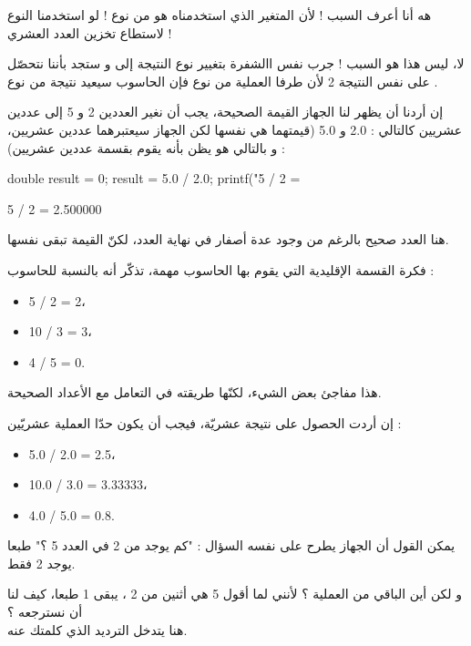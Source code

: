 \begin{question}
  هه أنا أعرف السبب ! لأن المتغير
  الذي استخدمناه هو من نوع
   !
  لو استخدمنا النوع
  لاستطاع تخزين العدد العشري !
\end{question}

لا، ليس هذا هو السبب ! جرب  نفس االشفرة بتغيير نوع النتيجة إلى
و ستجد بأننا نتحصّل على نفس النتيجة 2 لأن طرفا العملية من نوع
فإن الحاسوب سيعيد نتيجة من نوع
.

إن أردنا أن يظهر لنا الجهاز القيمة الصحيحة، يجب أن نغير العددين 2 و 5 إلى عددين عشريين كالتالي : 2.0 و 5.0 (قيمتهما هي نفسها لكن الجهاز سيعتبرهما عددين عشريين، و بالتالي هو يظن بأنه يقوم بقسمة عددين عشريين) :

\begin{Csource}
  double result = 0;
  result = 5.0 / 2.0;
  printf("5 / 2 =  %
\end{Csource}

\begin{Console}
  5 / 2 = 2.500000
\end{Console}

هنا العدد صحيح بالرغم من وجود عدة أصفار في نهاية العدد، لكنّ القيمة تبقى نفسها.

فكرة القسمة الإقليدية التي يقوم بها الحاسوب مهمة، تذكّر أنه بالنسبة للحاسوب :

\begin{itemize}
  \item 5 / 2 = 2،
  \item 10 / 3 = 3،
  \item 4 / 5 = 0.
\end{itemize}

هذا مفاجئ بعض الشيء، لكنّها طريقته في التعامل مع الأعداد الصحيحة.

إن أردت الحصول على نتيجة عشريّة، فيجب أن يكون حدّا العملية عشريّين :

\begin{itemize}
  \item 5.0 / 2.0 = 2.5،
  \item 10.0 / 3.0 = 3.33333،
  \item 4.0 / 5.0 = 0.8.
\end{itemize}

يمكن القول أن الجهاز يطرح على نفسه السؤال : "كم يوجد من 2 في العدد 5 ؟" طبعا يوجد 2 فقط.

و لكن أين الباقي من العملية ؟ لأنني لما أقول 5 هي أثنين من 2 ، يبقى 1 طبعا، كيف لنا أن نسترجعه ؟\\
هنا يتدخل الترديد الذي كلمتك عنه.

